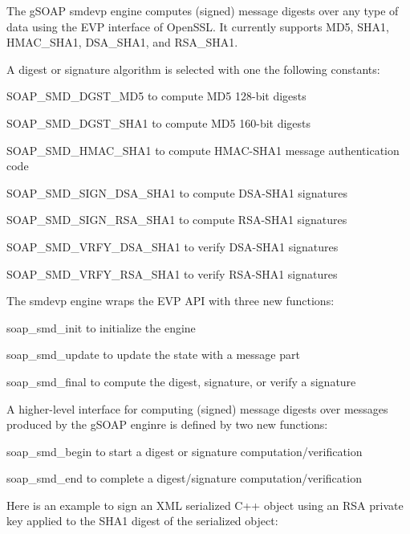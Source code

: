 The gSOAP smdevp engine computes (signed) message digests over any type of data using the EVP interface of OpenSSL. It currently supports MD5, SHA1, HMAC\_\-SHA1, DSA\_\-SHA1, and RSA\_\-SHA1.

A digest or signature algorithm is selected with one the following constants:


\begin{DoxyItemize}
\item SOAP\_\-SMD\_\-DGST\_\-MD5 to compute MD5 128-\/bit digests
\item SOAP\_\-SMD\_\-DGST\_\-SHA1 to compute MD5 160-\/bit digests
\item SOAP\_\-SMD\_\-HMAC\_\-SHA1 to compute HMAC-\/SHA1 message authentication code
\item SOAP\_\-SMD\_\-SIGN\_\-DSA\_\-SHA1 to compute DSA-\/SHA1 signatures
\item SOAP\_\-SMD\_\-SIGN\_\-RSA\_\-SHA1 to compute RSA-\/SHA1 signatures
\item SOAP\_\-SMD\_\-VRFY\_\-DSA\_\-SHA1 to verify DSA-\/SHA1 signatures
\item SOAP\_\-SMD\_\-VRFY\_\-RSA\_\-SHA1 to verify RSA-\/SHA1 signatures
\end{DoxyItemize}

The smdevp engine wraps the EVP API with three new functions:


\begin{DoxyItemize}
\item soap\_\-smd\_\-init to initialize the engine
\item soap\_\-smd\_\-update to update the state with a message part
\item soap\_\-smd\_\-final to compute the digest, signature, or verify a signature
\end{DoxyItemize}

A higher-\/level interface for computing (signed) message digests over messages produced by the gSOAP enginre is defined by two new functions:


\begin{DoxyItemize}
\item soap\_\-smd\_\-begin to start a digest or signature computation/verification
\item soap\_\-smd\_\-end to complete a digest/signature computation/verification
\end{DoxyItemize}

Here is an example to sign an XML serialized C++ object using an RSA private key applied to the SHA1 digest of the serialized object:


